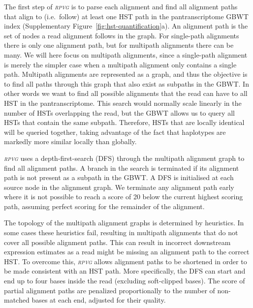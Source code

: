 \documentclass[11pt]{ucthesis}
\newcommand{\tool}[1]{\emph{\textsc{#1}}}
\begin{document}
The first step of \tool{rpvg} is to parse each alignment and find all alignment paths that align to (i.e.\ follow) at least one HST path in the pantranscriptome GBWT index (Supplementary Figure~\ref{fig:hst-quantification}a). An alignment path is the set of nodes a read alignment follows in the graph. For single-path alignments there is only one alignment path, but for multipath alignments there can be many. We will here focus on multipath alignments, since a single-path alignment is merely the simpler case when a multipath alignment only contains a single path. 
\newline 
\newline
Multipath alignments are represented as a graph, and thus the objective is to find all paths through this graph that also exist as subpaths in the GBWT. In other words we want to find all possible alignments that the read can have to all HST in the pantranscriptome. This search would normally scale linearly in the number of HSTs overlapping the read, but the GBWT allows us to query all HSTs that contain the same subpath. Therefore, HSTs that are locally identical will be queried together, taking advantage of the fact that haplotypes are markedly more similar locally than globally.  

\tool{rpvg} uses a depth-first-search (DFS) through the multipath alignment graph to find all alignment paths. A branch in the search is terminated if its alignment path is not present as a subpath in the GBWT. A DFS is initialised at each source node in the alignment graph. We terminate any alignment path early where it is not possible to reach a score of 20 below the current highest scoring path, assuming perfect scoring for the remainder of the alignment. 

The topology of the multipath alignment graphs is determined by heuristics. In some cases these heuristics fail, resulting in multipath alignments that do not cover all possible alignment paths. This can result in incorrect downstream expression estimates as a read might be missing an alignment path to the correct HST. To overcome this, \tool{rpvg} allows alignment paths to be shortened in order to be made consistent with an HST path. More specifically, the DFS can start and end up to four bases inside the read (excluding soft-clipped bases). The score of partial alignment paths are penalized proportionally to the number of non-matched bases at each end, adjusted for their quality. 
\end{document}
